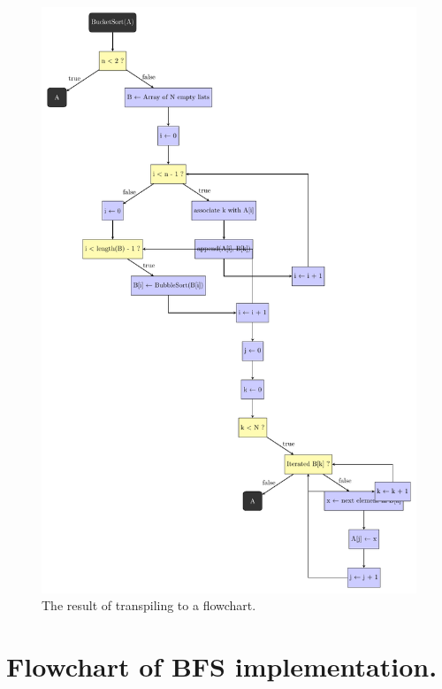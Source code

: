 \begin{figure}[ht!]
    \centering
    \includegraphics[scale=.6]{assets/chapter6/sort/BucketSort_ibp.pdf}
    \caption{The result of transpiling  to a flowchart.}
    \label{bucketSortIBP}
\end{figure}

\section{Flowchart of BFS implementation.}
\label{Flowchart of BFS implementation.}

